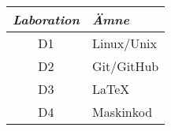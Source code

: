 \documentclass[a4paper]{memoir}
\begin{document}
\begin{Items}
    {\hspace{0.5cm}
    \begin{tabular}{cl}
        \emph{Laboration} & \emph{Ämne} \\ \midrule
        D1                & Linux/Unix  \\
        D2                & Git/GitHub  \\
        D3                & \LaTeX      \\
        D4                & Maskinkod   \\
    \end{tabular}
    }





\end{Items}
\end{document}
